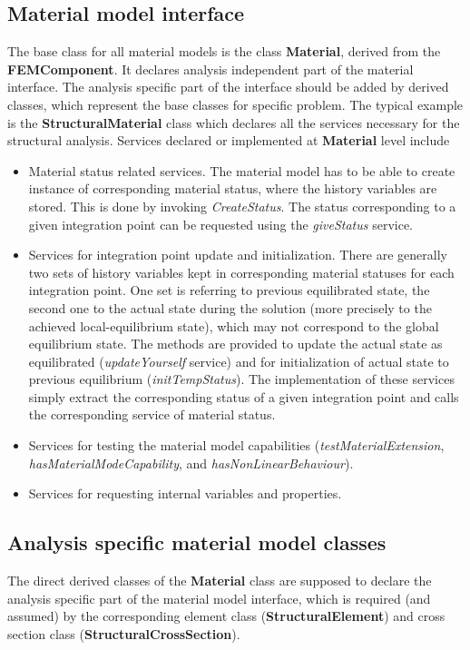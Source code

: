 \documentclass[12pt,draft]{article}
\newcommand{\class}[1]{{\bf #1}}
\newcommand{\service}[1]{{\em #1}}
\begin{document}
 \subsection{Material model interface}
 The base class for all material models is the class \class{Material},
 derived from the \class{FEMComponent}. It declares analysis independent
 part of the material interface. The analysis specific part of
 the interface should be added by derived classes, which represent the base
 classes for specific problem. The typical example is
 the \class{StructuralMaterial} class which declares all the services
 necessary for the structural analysis.
 Services declared or implemented at \class{Material} level include
 \begin{itemize}
 \item
 Material status related services. The material model has to be able to
 create instance of corresponding material status, where the history
 variables are stored. This is done by invoking \service{CreateStatus}.
 The status corresponding to a given integration point can be requested
 using the \service{giveStatus} service. 
 \item
 Services for integration point update and initialization. There are
 generally two sets of 
 history variables kept in corresponding material statuses for each
 integration point. One set is referring to previous equilibrated
 state, the second one to the actual state during the solution (more precisely to 
 the achieved local-equilibrium state), which may not
 correspond to the global equilibrium state. The methods are provided to update
 the actual state as equilibrated (\service{updateYourself} service) and for 
 initialization of actual state to previous equilibrium
 (\service{initTempStatus}). The implementation of these services
 simply extract the corresponding status of a given integration point and
 calls the corresponding service of material status. 
 \item
 Services for testing the material model capabilities
 (\service{testMaterialExtension}, \service{hasMaterialModeCapability},
 and \service{hasNonLinearBehaviour}).
 \item
 Services for requesting internal variables and properties.
 \end{itemize}

 \subsection{Analysis specific material model classes}
 The direct derived classes of the \class{Material} class are supposed
 to declare the analysis specific
 part of the material model interface, which is required (and assumed)
 by the corresponding
 element class (\class{StructuralElement}) and cross section class
 (\class{StructuralCrossSection}).
\end{document}
